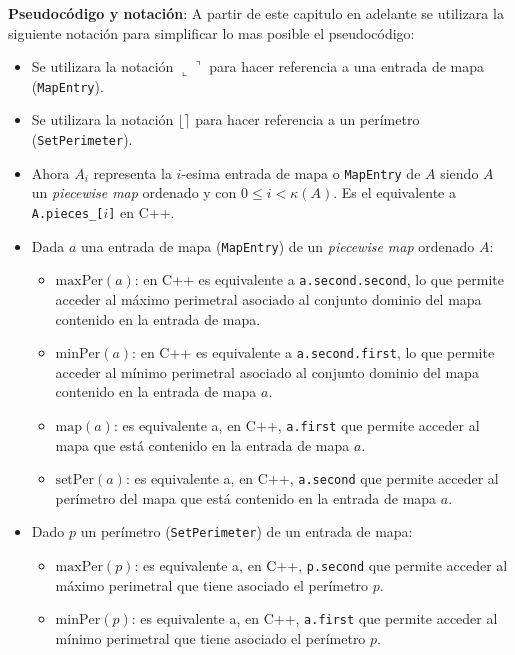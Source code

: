 \textbf{Pseudocódigo y notación}: A partir de este capitulo en adelante se utilizara la siguiente notación para simplificar lo mas posible el pseudocódigo:

\begin{itemize}
    \item Se utilizara la notación $\llcorner \urcorner$ para hacer referencia a una entrada de mapa (\texttt{MapEntry}).

    \item Se utilizara la notación $\lfloor\rceil$ para hacer referencia a un perímetro (\texttt{SetPerimeter}).

    \item Ahora $A_i$ representa la $i$-esima entrada de mapa o \texttt{MapEntry} de $A$ siendo $A$ un \textit{piecewise map} ordenado y con $0 \leq i < \kappa(A)$. Es el equivalente a \texttt{A.pieces\_[$i$]} en C++.

    \item Dada $a$ una entrada de mapa (\texttt{MapEntry}) de un \textit{piecewise map} ordenado $A$:
    \begin{itemize}
        \item $\mathrm{maxPer}(a)$: en C++ es equivalente a \texttt{a.second.second}, 
        lo que permite acceder al máximo perimetral asociado al conjunto dominio 
        del mapa contenido en la entrada de mapa.
        
        \item $\mathrm{minPer}(a)$: en C++ es equivalente a \texttt{a.second.first}, 
        lo que permite acceder al mínimo perimetral asociado al conjunto dominio 
        del mapa contenido en la entrada de mapa $a$.

        \item $\mathrm{map}(a)$: es equivalente a, en C++, \texttt{a.first} que permite acceder al mapa que está contenido en la entrada de mapa $a$.

        \item $\mathrm{setPer}(a)$: es equivalente a, en C++, \texttt{a.second} que permite acceder al perímetro  del mapa que está contenido en la entrada de mapa $a$.
    \end{itemize}

    \item Dado $p$ un perímetro (\texttt{SetPerimeter}) de un entrada de mapa:
    \begin{itemize}
        \item $\mathrm{maxPer}(p)$: es equivalente a, en C++, \texttt{p.second} que permite acceder al máximo perimetral que tiene asociado el perímetro $p$.
        \item $\mathrm{minPer}(p)$: es equivalente a, en C++, \texttt{a.first} que permite acceder al mínimo perimetral que tiene asociado el perímetro $p$.
    \end{itemize}

\end{itemize}




